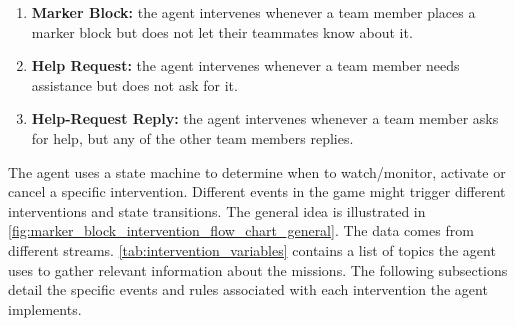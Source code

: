 \begin{enumerate}

    \item \textbf{Marker Block:} the agent intervenes whenever a team member
        places a marker block but does not let their teammates know about it.

    \item \textbf{Help Request:} the agent intervenes whenever a team member
        needs assistance but does not ask for it.

    \item \textbf{Help-Request Reply:} the agent intervenes whenever a team
        member asks for help, but any of the other team members replies.

\end{enumerate}

The agent uses a state machine to determine when to watch/monitor, activate or
cancel a specific intervention. Different events in the game might trigger
different interventions and state transitions. The general idea is illustrated
in \autoref{fig:marker_block_intervention_flow_chart_general}.  The data comes
from different streams.  \autoref{tab:intervention_variables} contains a list
of topics the agent uses to gather relevant information about the missions.
The following subsections detail the specific events and rules associated with
each intervention the agent implements.

